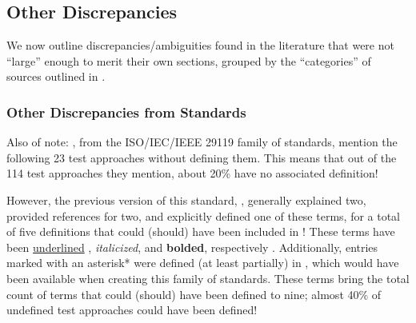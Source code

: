 \subsection{Other Discrepancies}
\label{other-discrep}

We now outline discrepancies/ambiguities found in the literature that were not
``large'' enough to merit their own sections, grouped by the ``categories'' of
sources outlined in .


\subsubsection{Other Discrepancies from Standards}


\ifnotpaper
      Also of note: \citep{IEEE2022, IEEE2021}, from the
      ISO/IEC/IEEE 29119 family of standards, mention the following 23 test
      approaches without defining them. This means that out of the 114 test
      approaches they mention, about 20\% have no associated definition!

      However, the previous version of this standard, \citeyearpar{IEEE2013},
      generally explained two, provided references for two, and explicitly defined
      one of these terms, for a total of five definitions that could (should) have
      been included in \citeyearpar{IEEE2022}! These terms have been
      \underline{underlined}\ifnotpaper%
            , \emph{italicized}, and \textbf{bolded}, respectively%
      \fi. Additionally, entries marked with an asterisk* were defined (at least
      partially) in \citeyearpar{IEEE2017}, which would have been available when
      creating this family of standards. These terms bring the total count of terms
      that could (should) have been defined to nine; almost 40\% of undefined test
      approaches could have been defined!


